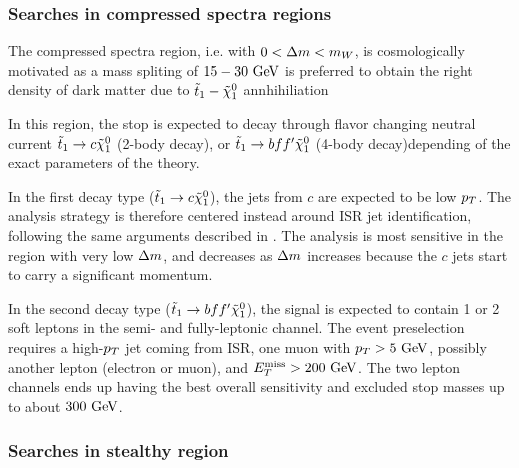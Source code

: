     \subsubsection{Searches in compressed spectra regions}

    The compressed spectra region, i.e. with $0 < \Delta m < m_{W}$, is cosmologically
    motivated as a mass spliting of $15-30~\text{GeV}$ is preferred to obtain the right density
    of dark matter due to $\tilde{t}_1-\tilde{\chi}_1^0$ annhihiliation \cite{TheLightStopWindow,SUSYBaryogenesis}

    In this region, the stop is expected to decay through flavor changing neutral current
    $\tilde{t}_1 \rightarrow c \tilde{\chi}_1^0$ (2-body decay), or $\tilde{t}_1 \rightarrow bff' \tilde{\chi}_1^0$
    (4-body decay)depending of the exact parameters of the theory.

    In the first decay type ($\tilde{t}_1 \rightarrow c \tilde{\chi}_1^0$), the jets from $c$ are
    expected to be low $p_T$. The analysis strategy is therefore centered instead around
    ISR jet identification, following the same arguments described in .
    The analysis is most sensitive in the region with very low $\Delta m$, and decreases as
    $\Delta m$ increases because the $c$ jets start to carry a significant momentum.

    In the second decay type ($\tilde{t}_1 \rightarrow bff' \tilde{\chi}_1^0$), the signal is expected
    to contain 1 or 2 soft leptons in the semi- and fully-leptonic channel. The event preselection
    requires a high-$p_T$ jet coming from ISR, one muon with $p_T > 5~\text{GeV}$, possibly another
    lepton (electron or muon), and $E_T^\text{miss} > 200~\text{GeV}$. The two lepton channels ends up having
    the best overall sensitivity and excluded stop masses up to about $300~\text{GeV}$.

    \subsubsection{Searches in stealthy region}

